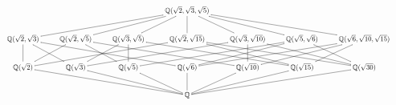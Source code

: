 \documentclass[12pt]{article}
\begin{document}
			
			
			\begin{displaymath}
  				\resizebox{\textwidth}{!}{\xymatrix{
					& & & \mathbb{Q}(\sqrt{2},\sqrt{3},\sqrt{5}) \ar@{-}[dlll] \ar@{-}[dll] \ar@{-}[dl] \ar@{-}[d] \ar@{-}[dr] \ar@{-}[drr] \ar@{-}[drrr] & & & \\
					\mathbb{Q}(\sqrt{2},\sqrt{3}) \ar@{-}[d] \ar@{-}[dr] \ar@{-}[drrr] & \mathbb{Q}(\sqrt{2},\sqrt{5}) \ar@{-}[dl] \ar@{-}[dr] \ar@{-}[drrr]  & \mathbb{Q}(\sqrt{3},\sqrt{5}) \ar@{-}[dl] \ar@{-}[d] \ar@{-}[drrr] & \mathbb{Q}(\sqrt{2},\sqrt{15}) \ar@{-}[dlll] \ar@{-}[drr] \ar@{-}[drrr]  & \mathbb{Q}(\sqrt{3},\sqrt{10}) \ar@{-}[dlll] \ar@{-}[d] \ar@{-}[drr] & \mathbb{Q}(\sqrt{5},\sqrt{6}) \ar@{-}[dlll] \ar@{-}[dll] \ar@{-}[dr] & \mathbb{Q}(\sqrt{6},\sqrt{10},\sqrt{15}) \ar@{-}[dlll] \ar@{-}[dll] \ar@{-}[dl]\\
					\mathbb{Q}(\sqrt{2}) \ar@{-}[drrr] & \mathbb{Q}(\sqrt{3}) \ar@{-}[drr] & \mathbb{Q}(\sqrt{5}) \ar@{-}[dr] & \mathbb{Q}(\sqrt{6}) \ar@{-}[d] & \mathbb{Q}(\sqrt{10}) \ar@{-}[dl] & \mathbb{Q}(\sqrt{15}) \ar@{-}[dll] & \mathbb{Q}(\sqrt{30}) \ar@{-}[dlll] \\
					& & & \mathbb{Q} & & & }}
			\end{displaymath}
\end{document}
